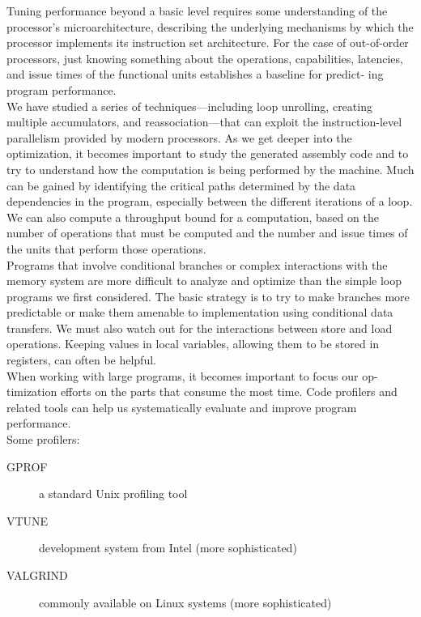 \documentclass[11pt]{article}
\begin{document}
Tuning performance beyond a basic level requires some understanding of the processor’s microarchitecture, describing the underlying mechanisms by which the processor implements its instruction set architecture. For the case of out-of-order processors, just knowing something about the operations, capabilities, latencies, and issue times of the functional units establishes a baseline for predict- ing program performance.\\


We have studied a series of techniques—including loop unrolling, creating multiple accumulators, and reassociation—that can exploit the instruction-level parallelism provided by modern processors. As we get deeper into the optimization, it becomes important to study the generated assembly code and to try to understand how the computation is being performed by the machine. Much can be gained by identifying the critical paths determined by the data dependencies in the program, especially between the different iterations of a loop. We can also compute a throughput bound for a computation, based on the number of operations that must be computed and the number and issue times of the units that perform those operations.\\


Programs that involve conditional branches or complex interactions with the memory system are more difficult to analyze and optimize than the simple loop programs we first considered. The basic strategy is to try to make branches more predictable or make them amenable to implementation using conditional data transfers. We must also watch out for the interactions between store and load operations. Keeping values in local variables, allowing them to be stored in registers, can often be helpful.\\


When working with large programs, it becomes important to focus our op- timization efforts on the parts that consume the most time. Code profilers and related tools can help us systematically evaluate and improve program performance.\\
Some profilers:\\
\begin{description}
\item[{GPROF}] a standard Unix profiling tool\\
\item[{VTUNE}] development system from Intel (more sophisticated)\\
\item[{VALGRIND}] commonly available on Linux systems (more sophisticated)\\
\end{description}
\end{document}
